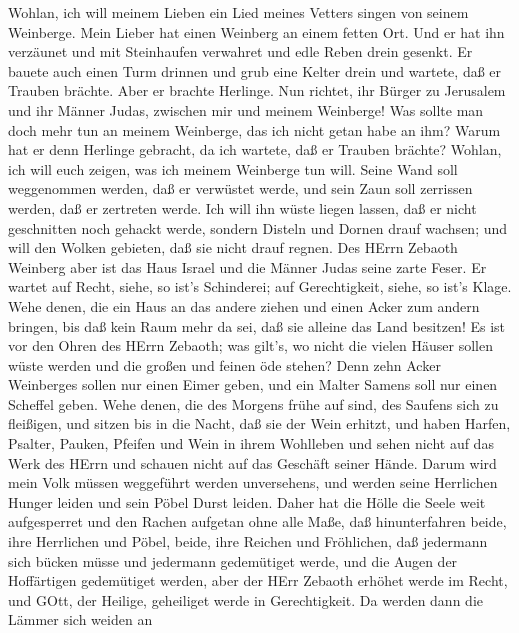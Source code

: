  Wohlan, ich will meinem Lieben ein Lied meines Vetters
singen von seinem Weinberge. Mein Lieber hat einen Weinberg an einem
fetten Ort.  Und er hat ihn verzäunet und mit Steinhaufen
verwahret und edle Reben drein gesenkt. Er bauete auch einen Turm
drinnen und grub eine Kelter drein und wartete, daß er Trauben brächte.
Aber er brachte Herlinge.  Nun richtet, ihr Bürger zu
Jerusalem und ihr Männer Judas, zwischen mir und meinem Weinberge!
 Was sollte man doch mehr tun an meinem Weinberge, das ich
nicht getan habe an ihm? Warum hat er denn Herlinge gebracht, da ich
wartete, daß er Trauben brächte?  Wohlan, ich will euch
zeigen, was ich meinem Weinberge tun will. Seine Wand soll weggenommen
werden, daß er verwüstet werde, und sein Zaun soll zerrissen werden, daß
er zertreten werde.  Ich will ihn wüste liegen lassen, daß
er nicht geschnitten noch gehackt werde, sondern Disteln und Dornen
drauf wachsen; und will den Wolken gebieten, daß sie nicht drauf regnen.
 Des HErrn Zebaoth Weinberg aber ist das Haus Israel und die
Männer Judas seine zarte Feser. Er wartet auf Recht, siehe, so ist's
Schinderei; auf Gerechtigkeit, siehe, so ist's Klage.  Wehe
denen, die ein Haus an das andere ziehen und einen Acker zum andern
bringen, bis daß kein Raum mehr da sei, daß sie alleine das Land
besitzen!  Es ist vor den Ohren des HErrn Zebaoth; was
gilt's, wo nicht die vielen Häuser sollen wüste werden und die großen
und feinen öde stehen?  Denn zehn Acker Weinberges sollen
nur einen Eimer geben, und ein Malter Samens soll nur einen Scheffel
geben.  Wehe denen, die des Morgens frühe auf sind, des
Saufens sich zu fleißigen, und sitzen bis in die Nacht, daß sie der Wein
erhitzt,  und haben Harfen, Psalter, Pauken, Pfeifen und
Wein in ihrem Wohlleben und sehen nicht auf das Werk des HErrn und
schauen nicht auf das Geschäft seiner Hände.  Darum wird
mein Volk müssen weggeführt werden unversehens, und werden seine
Herrlichen Hunger leiden und sein Pöbel Durst leiden. 
Daher hat die Hölle die Seele weit aufgesperret und den Rachen aufgetan
ohne alle Maße, daß hinunterfahren beide, ihre Herrlichen und Pöbel,
beide, ihre Reichen und Fröhlichen,  daß jedermann sich
bücken müsse und jedermann gedemütiget werde, und die Augen der
Hoffärtigen gedemütiget werden,  aber der HErr Zebaoth
erhöhet werde im Recht, und GOtt, der Heilige, geheiliget werde in
Gerechtigkeit.  Da werden dann die Lämmer sich weiden an
